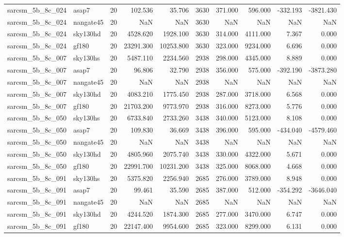 \begin{tabular}{llrrrrrrrr}
sarcsm\_5b\_8c\_024 & asap7 & 20 & 102.536 & 35.706 & 3630 & 371.000 & 596.000 & -332.193 & -3821.430 \\
sarcsm\_5b\_8c\_024 & nangate45 & 20 & NaN & NaN & 3630 & NaN & NaN & NaN & NaN \\
sarcsm\_5b\_8c\_024 & sky130hd & 20 & 4528.620 & 1928.100 & 3630 & 314.000 & 4111.000 & 7.367 & 0.000 \\
sarcsm\_5b\_8c\_024 & gf180 & 20 & 23291.300 & 10253.800 & 3630 & 323.000 & 9234.000 & 6.696 & 0.000 \\
sarcsm\_5b\_8c\_007 & sky130hs & 20 & 5487.110 & 2234.560 & 2938 & 298.000 & 4345.000 & 8.889 & 0.000 \\
sarcsm\_5b\_8c\_007 & asap7 & 20 & 96.806 & 32.790 & 2938 & 356.000 & 575.000 & -392.190 & -3873.280 \\
sarcsm\_5b\_8c\_007 & nangate45 & 20 & NaN & NaN & 2938 & NaN & NaN & NaN & NaN \\
sarcsm\_5b\_8c\_007 & sky130hd & 20 & 4083.210 & 1775.450 & 2938 & 287.000 & 3718.000 & 6.568 & 0.000 \\
sarcsm\_5b\_8c\_007 & gf180 & 20 & 21703.200 & 9773.970 & 2938 & 316.000 & 8273.000 & 5.776 & 0.000 \\
sarcsm\_5b\_8c\_050 & sky130hs & 20 & 6733.840 & 2733.260 & 3438 & 340.000 & 5123.000 & 8.108 & 0.000 \\
sarcsm\_5b\_8c\_050 & asap7 & 20 & 109.830 & 36.669 & 3438 & 396.000 & 595.000 & -434.040 & -4579.460 \\
sarcsm\_5b\_8c\_050 & nangate45 & 20 & NaN & NaN & 3438 & NaN & NaN & NaN & NaN \\
sarcsm\_5b\_8c\_050 & sky130hd & 20 & 4805.960 & 2075.740 & 3438 & 330.000 & 4322.000 & 5.671 & 0.000 \\
sarcsm\_5b\_8c\_050 & gf180 & 20 & 22991.700 & 10231.200 & 3438 & 325.000 & 8068.000 & 4.668 & 0.000 \\
sarcsm\_5b\_8c\_091 & sky130hs & 20 & 5375.820 & 2256.940 & 2685 & 276.000 & 3789.000 & 8.948 & 0.000 \\
sarcsm\_5b\_8c\_091 & asap7 & 20 & 99.461 & 35.590 & 2685 & 387.000 & 512.000 & -354.292 & -3646.040 \\
sarcsm\_5b\_8c\_091 & nangate45 & 20 & NaN & NaN & 2685 & NaN & NaN & NaN & NaN \\
sarcsm\_5b\_8c\_091 & sky130hd & 20 & 4244.520 & 1874.300 & 2685 & 277.000 & 3470.000 & 6.747 & 0.000 \\
sarcsm\_5b\_8c\_091 & gf180 & 20 & 22147.400 & 9954.600 & 2685 & 323.000 & 8299.000 & 6.131 & 0.000 \\

\end{tabular}
